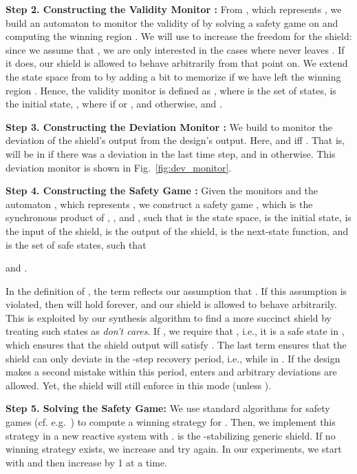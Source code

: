 \documentclass{llncs}
\begin{document}
\noindent
\textbf{Step 2. Constructing the Validity Monitor :}
From , which represents 
, we build an automaton  to monitor the validity 
of  by solving a safety game on  and computing the 
winning region . We will use  to increase the 
freedom for the shield: since we assume that 
, we are only interested in the cases where 
 never leaves .  If it does, our shield is 
allowed to behave arbitrarily from that point on.  
We extend the state space from  to  by adding a bit to 
memorize if we have left the winning region .  Hence, the 
validity monitor is defined as , where  is the set of states, 
 is the initial state, 
, where 
 if  or , and 
 otherwise, and  .

\noindent
\textbf{Step 3. Constructing the Deviation Monitor :}
We build  
to monitor the deviation of the shield's output from the design's 
output. Here,  and  iff . That is, 
 will be in  if there was a deviation in the last time 
step, and in  otherwise.  This deviation monitor is shown in 
Fig.~\ref{fig:dev_monitor}.

\noindent
\textbf{Step 4. Constructing the Safety Game :}
Given the monitors  and the 
automaton , which represents , we construct a safety 
game  
, which is the synchronous product of , 
,  and , such that  is the state space,  
is the initial state,  is the input of the 
shield,  is the output of the shield,  is the 
next-state function, and  is the set of safe states, such that


and .

In the definition of , the term  reflects our 
assumption that .  If this assumption is 
violated, then  will hold forever, and our shield is 
allowed to behave arbitrarily.  This is exploited by our synthesis 
algorithm to find a more succinct shield  by treating such states as 
\emph{don't cares}.  If , we require that , 
i.e., it is a safe state in , which ensures that the shield 
output will satisfy . The last term ensures that the shield can 
only deviate in the -step recovery period, i.e., while  in 
.  If the design makes a second mistake within this period, 
 enters  and arbitrary deviations are allowed.  Yet, 
the shield will still enforce  in this mode (unless ).

\noindent
\textbf{Step 5. Solving the Safety Game:}  
We use standard algorithms for safety games (cf.  e.g.~\cite{Mazala01}) 
to compute a winning strategy  for .  Then, we 
implement this strategy in a new reactive system  with .  is the 
-stabilizing generic shield.  If no winning strategy exists, we 
increase  and try again.  In our experiments, we start with  and 
then increase  by 1 at a time.
\end{document}
